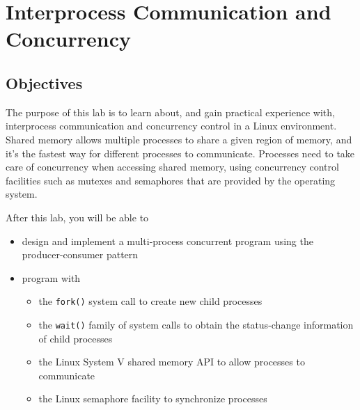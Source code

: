 \chapter{Interprocess Communication and Concurrency}

\section{Objectives}

The purpose of this lab is to learn about, and gain practical experience with,
interprocess communication and concurrency control in a Linux environment.
Shared memory allows multiple processes to share a given region of memory, and it's the fastest way for different processes to communicate.
Processes need to take care of concurrency when accessing shared memory, using concurrency control facilities such as mutexes and semaphores that are provided by the operating system.
 

After this lab, you will be able to
\begin{itemize}
\item design and implement a multi-process concurrent program using the producer-consumer pattern
\item program with
        \begin{itemize}
	\item the \verb+fork()+ system call to create new child processes
	\item the \verb+wait()+ family of system calls to obtain
	          the status-change information of child processes
        \item the Linux System V shared memory API to allow processes to communicate
        \item the Linux semaphore facility to synchronize processes
        \end{itemize}              
\end{itemize}


